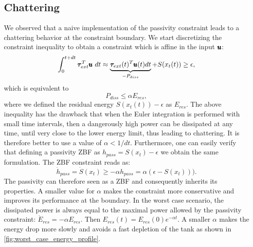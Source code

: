 \subsection{Chattering}
We observed that a naive implementation of the passivity constraint leads to a chattering behavior at the constraint boundary. We start discretizing the constraint inequality to obtain a constraint which is affine in the input $\pmb{u}$:
\begin{equation*}
    \int_{0}^{t + dt} \boldsymbol{\tau}_{ext}^T \pmb{u} \ dt \approx \underbrace{\boldsymbol{\tau}_{ext}(t)^T \pmb{u}(t) dt}_{-P_{diss}} + S(x_t(t)) \geq \epsilon,
\end{equation*}
which is equivalent to 
\begin{equation} \label{eq:passivity_simple}
    P_{diss} \leq \alpha E_{res},
\end{equation}
where we defined the residual energy $S(x_t(t))-\epsilon$ as $E_{res}$. The above inequality has the drawback that when the Euler integration is performed with small time intervals, then a dangerously high power can be dissipated at any time, until very close to the lower energy limit, thus leading to chattering. It is therefore better to use a value of $\alpha < 1/dt$. Furthermore, one can easily verify that defining a passivity ZBF as $h_{pass} = S(x_t) - \epsilon$ we obtain the same formulation. The ZBF constraint reads as:
\begin{equation*}
    \dot{h}_{pass} = \dot{S}(x_t) \geq -\alpha h_{pass}
     =\alpha (\epsilon - S(x_t))).
\end{equation*}
The passivity can therefore seen as a ZBF and consequently inherits its properties. A smaller value for $\alpha$ makes the constraint more conservative and improves its performance at the boundary. In the worst case scenario, the dissipated power is always equal to the maximal power allowed by the passivity constraint: $\dot{E}_{res} = - \alpha E_{res}$. Then $E_{res}(t) = E_{res}(0) e^{-\alpha t}$. A smaller $\alpha$ makes the energy drop more slowly and avoids a fast depletion of the tank as shown in \fig \ref{fig:worst_case_energy_profile}.
